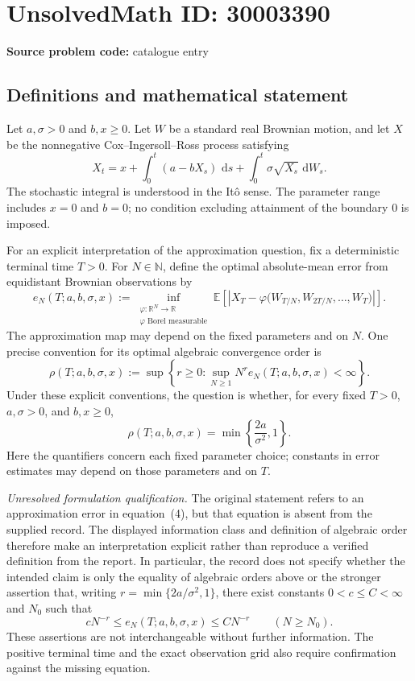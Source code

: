 \documentclass[11pt]{article}
\newcommand{\N}{\mathbb{N}}
\newcommand{\R}{\mathbb{R}}
\newcommand{\E}{\mathbb{E}}
\newcommand{\dd}{\,\mathrm{d}}
\begin{document}
\section*{UnsolvedMath ID: 30003390}
\textbf{Source problem code:} catalogue entry
\subsection{Definitions and mathematical statement}
Let \(a,\sigma>0\) and \(b,x\geq0\). Let \(W\) be a standard real Brownian motion, and let \(X\) be the nonnegative Cox--Ingersoll--Ross process satisfying
\[
X_t=x+\int_0^t(a-bX_s)\,\dd s+\int_0^t\sigma\sqrt{X_s}\,\dd W_s.
\]
The stochastic integral is understood in the It\^o sense. The parameter range includes \(x=0\) and \(b=0\); no condition excluding attainment of the boundary \(0\) is imposed.

For an explicit interpretation of the approximation question, fix a deterministic terminal time \(T>0\). For \(N\in\N\), define the optimal absolute-mean error from equidistant Brownian observations by
\[
e_N(T;a,b,\sigma,x)
:=\inf_{\substack{\varphi:\R^N\to\R\\ \varphi\text{ Borel measurable}}}
\E\!\left[\left|X_T-\varphi\bigl(W_{T/N},W_{2T/N},\ldots,W_T\bigr)\right|\right].
\]
The approximation map may depend on the fixed parameters and on \(N\). One precise convention for its optimal algebraic convergence order is
\[
\rho(T;a,b,\sigma,x)
:=\sup\left\{r\geq0:\sup_{N\geq1}N^r e_N(T;a,b,\sigma,x)<\infty\right\}.
\]
Under these explicit conventions, the question is whether, for every fixed \(T>0\), \(a,\sigma>0\), and \(b,x\geq0\),
\[
\rho(T;a,b,\sigma,x)
=\min\left\{\frac{2a}{\sigma^2},1\right\}.
\]
Here the quantifiers concern each fixed parameter choice; constants in error estimates may depend on those parameters and on \(T\).

\textit{Unresolved formulation qualification.} The original statement refers to an approximation error in equation~(4), but that equation is absent from the supplied record. The displayed information class and definition of algebraic order therefore make an interpretation explicit rather than reproduce a verified definition from the report. In particular, the record does not specify whether the intended claim is only the equality of algebraic orders above or the stronger assertion that, writing \(r=\min\{2a/\sigma^2,1\}\), there exist constants \(0<c\leq C<\infty\) and \(N_0\) such that
\[
cN^{-r}\leq e_N(T;a,b,\sigma,x)\leq CN^{-r}
\qquad(N\geq N_0).
\]
These assertions are not interchangeable without further information. The positive terminal time and the exact observation grid also require confirmation against the missing equation.
\end{document}
